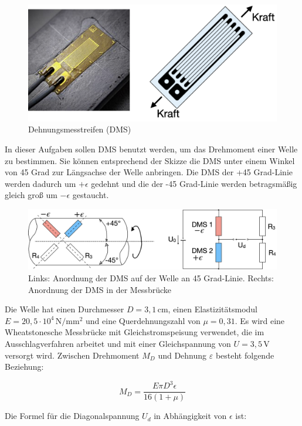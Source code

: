 \documentclass[
]{book}
\begin{document}
\begin{figure}
\centering
\includegraphics{pictures/DMS.png}
\caption{Dehnungsmesstreifen (DMS)}
\end{figure}

In dieser Aufgaben sollen DMS benutzt werden, um das Drehmoment einer Welle zu bestimmen. Sie können entsprechend der Skizze die DMS unter einem Winkel von 45 Grad zur Längsachse der Welle anbringen. Die DMS der +45 Grad-Linie werden dadurch um \(+\epsilon\) gedehnt und die der -45 Grad-Linie werden betragsmäßig gleich groß um \(-\epsilon\) gestaucht.

\begin{figure}
\centering
\includegraphics{pictures/DMS_messbruecke.png}
\caption{Links: Anordnung der DMS auf der Welle an 45 Grad-Linie. Rechts: Anordnung der DMS in der Messbrücke}
\end{figure}

Die Welle hat einen Durchmesser \(D = 3{,}1\,\mathrm{cm}\), einen Elastizitätsmodul \(E = 20{,}5 \cdot 10^{4}\,\mathrm{N/mm^{2}}\) und eine Querdehnungszahl von \(\mu = 0{,}31\). Es wird eine Wheatstonesche Messbrücke mit Gleichstromspeisung verwendet, die im Ausschlagverfahren arbeitet und mit einer Gleichspannung von \(U = 3{,}5\,\mathrm V\) versorgt wird. Zwischen Drehmoment \(M_{D}\) und Dehnung \(\varepsilon\) besteht folgende Beziehung:

\[M_{D} = \frac{E \pi D^{3} \epsilon}{16 (1+\mu)}\]

Die Formel für die Diagonalspannung \(U_{d}\) in Abhängigkeit von \(\epsilon\) ist:
\end{document}
